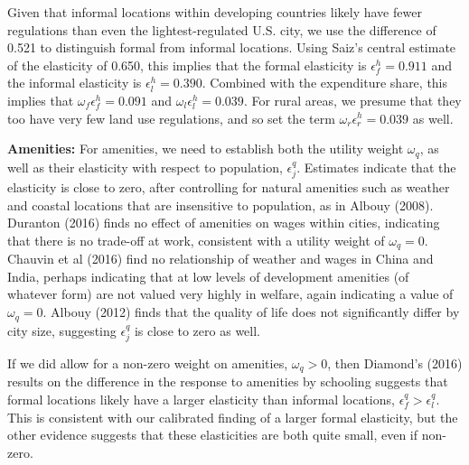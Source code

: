 \documentclass[10pt]{article}
\begin{document}
Given that informal locations within developing countries likely have fewer regulations than even the lightest-regulated U.S. city, we use the difference of 0.521 to distinguish formal from informal locations. Using Saiz's central estimate of the elasticity of 0.650, this implies that the formal elasticity is $\epsilon^h_f = 0.911$ and the informal elasticity is $\epsilon^h_l = 0.390$. Combined with the expenditure share, this implies that $\omega_f \epsilon^h_f = 0.091$ and $\omega_l \epsilon^h_l = 0.039$. For rural areas, we presume that they too have very few land use regulations, and so set the term $\omega_r \epsilon^h_r = 0.039$ as well. 

\textbf{Amenities:} For amenities, we need to establish both the utility weight $\omega_q$, as well as their elasticity with respect to population, $\epsilon^q_j$. Estimates indicate that the elasticity is close to zero, after controlling for natural amenities such as weather and coastal locations that are insensitive to population, as in Albouy (2008). Duranton (2016) finds no effect of amenities on wages within cities, indicating that there is no trade-off at work, consistent with a utility weight of $\omega_q = 0$. Chauvin et al (2016) find no relationship of weather and wages in China and India, perhaps indicating that at low levels of development amenities (of whatever form) are not valued very highly in welfare, again indicating a value of $\omega_q = 0$. Albouy (2012) finds that the quality of life does not significantly differ by city size, suggesting $\epsilon^q_j$ is close to zero as well. 

If we did allow for a non-zero weight on amenities, $\omega_q >0$, then Diamond's (2016) results on the difference in the response to amenities by schooling suggests that formal locations likely have a larger elasticity than informal locations, $\epsilon^q_f > \epsilon^q_l$. This is consistent with our calibrated finding of a larger formal elasticity, but the other evidence suggests that these elasticities are both quite small, even if non-zero.
\end{document}

